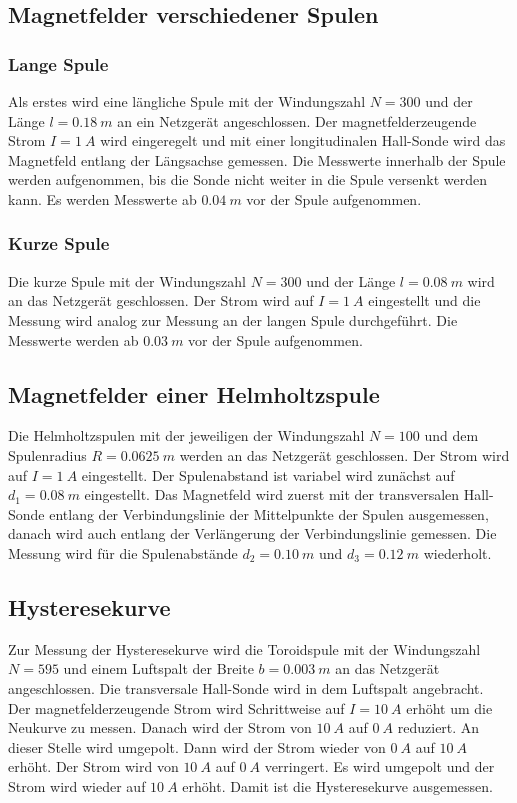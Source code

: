 \subsection{Magnetfelder verschiedener Spulen}
\subsubsection{Lange Spule}
Als erstes wird eine längliche Spule mit der Windungszahl $N=300$ und der Länge $l=\SI{0.18}{m}$ an ein Netzgerät angeschlossen.
Der magnetfelderzeugende Strom $I=\SI{1}{A}$ wird eingeregelt und mit einer longitudinalen Hall-Sonde wird das Magnetfeld entlang der Längsachse gemessen.
Die Messwerte innerhalb der Spule werden aufgenommen, bis die Sonde nicht weiter in die Spule versenkt werden kann.
Es werden Messwerte ab $\SI{0.04}{m}$ vor der Spule aufgenommen.

\subsubsection{Kurze Spule}
Die kurze Spule mit der Windungszahl $N=300$ und der Länge $l=\SI{0.08}{m}$ wird an das Netzgerät geschlossen.
Der Strom wird auf $I=\SI{1}{A}$ eingestellt und die Messung wird analog zur Messung an der langen Spule durchgeführt.
Die Messwerte werden ab $\SI{0.03}{m}$ vor der Spule aufgenommen.

\subsection{Magnetfelder einer Helmholtzspule}
Die Helmholtzspulen mit der jeweiligen der Windungszahl $N=100$ und dem Spulenradius $R=\SI{0.0625}{m}$ werden an das Netzgerät geschlossen.
Der Strom wird auf $I=\SI{1}{A}$ eingestellt.
Der Spulenabstand ist variabel wird zunächst auf $d_{1}=\SI{0.08}{m}$ eingestellt.
Das Magnetfeld wird zuerst mit der transversalen Hall-Sonde entlang der Verbindungslinie der Mittelpunkte der Spulen ausgemessen, danach wird auch entlang der Verlängerung der Verbindungslinie gemessen.
Die Messung wird für die Spulenabstände $d_{2}=\SI{0.10}{m}$ und $d_{3}=\SI{0.12}{m}$ wiederholt.

\subsection{Hysteresekurve}
Zur Messung der Hysteresekurve wird die Toroidspule mit der Windungszahl $N=595$ und einem Luftspalt der Breite $b=\SI{0.003}{m}$ an das Netzgerät angeschlossen.
Die transversale Hall-Sonde wird in dem Luftspalt angebracht.
\\Der magnetfelderzeugende Strom wird Schrittweise auf $I=\SI{10}{A}$ erhöht um die Neukurve zu messen.
Danach wird der Strom von $\SI{10}{A}$ auf $\SI{0}{A}$ reduziert.
An dieser Stelle wird umgepolt.
Dann wird der Strom wieder von $\SI{0}{A}$ auf $\SI{10}{A}$ erhöht.
Der Strom wird von $\SI{10}{A}$ auf $\SI{0}{A}$ verringert.
Es wird umgepolt und der Strom wird wieder auf $\SI{10}{A}$ erhöht.
Damit ist die Hysteresekurve ausgemessen.

